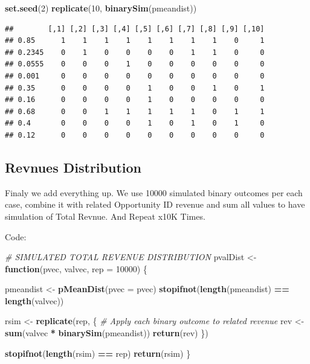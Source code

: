 \documentclass[]{article}
\newenvironment{Shaded}{\begin{snugshade}}{\end{snugshade}}
\newcommand{\CommentTok}[1]{\textcolor[rgb]{0.56,0.35,0.01}{\textit{#1}}}
\newcommand{\ControlFlowTok}[1]{\textcolor[rgb]{0.13,0.29,0.53}{\textbf{#1}}}
\newcommand{\DataTypeTok}[1]{\textcolor[rgb]{0.13,0.29,0.53}{#1}}
\newcommand{\DecValTok}[1]{\textcolor[rgb]{0.00,0.00,0.81}{#1}}
\newcommand{\KeywordTok}[1]{\textcolor[rgb]{0.13,0.29,0.53}{\textbf{#1}}}
\newcommand{\NormalTok}[1]{#1}
\newcommand{\OperatorTok}[1]{\textcolor[rgb]{0.81,0.36,0.00}{\textbf{#1}}}
\newcommand{\StringTok}[1]{\textcolor[rgb]{0.31,0.60,0.02}{#1}}
\begin{document}
\begin{Shaded}
\begin{Highlighting}[]
\KeywordTok{set.seed}\NormalTok{(}\DecValTok{2}\NormalTok{)}
\KeywordTok{replicate}\NormalTok{(}\DecValTok{10}\NormalTok{, }\KeywordTok{binarySim}\NormalTok{(pmeandist))}
\end{Highlighting}
\end{Shaded}

\begin{verbatim}
##        [,1] [,2] [,3] [,4] [,5] [,6] [,7] [,8] [,9] [,10]
## 0.85      1    1    1    1    1    1    1    1    0     1
## 0.2345    0    1    0    0    0    0    1    1    0     0
## 0.0555    0    0    0    1    0    0    0    0    0     0
## 0.001     0    0    0    0    0    0    0    0    0     0
## 0.35      0    0    0    0    1    0    0    1    0     1
## 0.16      0    0    0    0    1    0    0    0    0     0
## 0.68      0    0    1    1    1    1    1    0    1     1
## 0.4       0    0    0    0    1    0    1    0    1     0
## 0.12      0    0    0    0    0    0    0    0    0     0
\end{verbatim}

\hypertarget{revnues-distribution}{%
\subsection{Revnues Distribution}\label{revnues-distribution}}

Finaly we add everything up. We use 10000 simulated binary outcomes per
each case, combine it with related Opportunity ID revenue and sum all
values to have simulation of Total Revnue. And Repeat x10K Times.

Code:

\begin{Shaded}
\begin{Highlighting}[]
\CommentTok{# SIMULATED TOTAL REVENUE DISTRIBUTION}
\NormalTok{pvalDist <-}\StringTok{ }\ControlFlowTok{function}\NormalTok{(pvec, valvec, }\DataTypeTok{rep =} \DecValTok{10000}\NormalTok{) \{}
        
\NormalTok{        pmeandist <-}\StringTok{ }\KeywordTok{pMeanDist}\NormalTok{(}\DataTypeTok{pvec =}\NormalTok{ pvec)}
        \KeywordTok{stopifnot}\NormalTok{(}\KeywordTok{length}\NormalTok{(pmeandist) }\OperatorTok{==}\StringTok{ }\KeywordTok{length}\NormalTok{(valvec))}
        
\NormalTok{        rsim <-}\StringTok{ }\KeywordTok{replicate}\NormalTok{(rep, \{}
                \CommentTok{# Apply each binary outcome to related revenue}
\NormalTok{                rev <-}\StringTok{ }\KeywordTok{sum}\NormalTok{(valvec }\OperatorTok{*}\StringTok{ }\KeywordTok{binarySim}\NormalTok{(pmeandist))}
                \KeywordTok{return}\NormalTok{(rev)}
\NormalTok{        \})}
        
        \KeywordTok{stopifnot}\NormalTok{(}\KeywordTok{length}\NormalTok{(rsim) }\OperatorTok{==}\StringTok{ }\NormalTok{rep)}
        \KeywordTok{return}\NormalTok{(rsim)}
\NormalTok{\}}
\end{Highlighting}
\end{Shaded}
\end{document}
